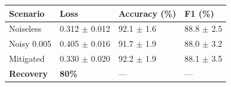 \begin{tabular}{llll}
\toprule
Scenario & Loss & Accuracy (\%) & F1 (\%) \\
\midrule
Noiseless & 0.312 $\pm$ 0.012 & 92.1 $\pm$ 1.6 & 88.8 $\pm$ 2.5 \\
Noisy 0.005 & 0.405 $\pm$ 0.016 & 91.7 $\pm$ 1.9 & 88.0 $\pm$ 3.2 \\
Mitigated & 0.330 $\pm$ 0.020 & 92.2 $\pm$ 1.9 & 88.1 $\pm$ 3.5 \\
\textbf{Recovery} & \textbf{80\%} & --- & --- \\
\bottomrule
\end{tabular}
